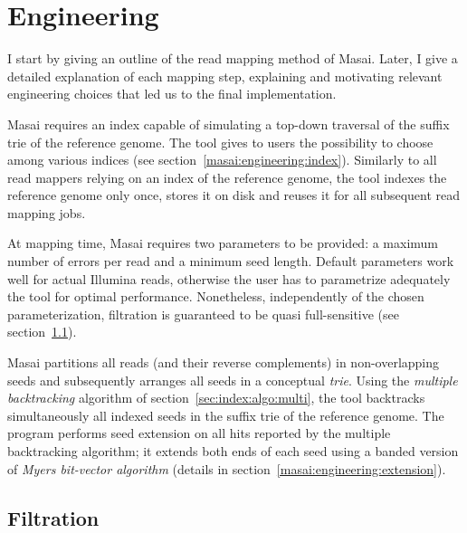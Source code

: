 
\section{Engineering}

I start by giving an outline of the read mapping method of Masai.
Later, I give a detailed explanation of each mapping step, explaining and motivating relevant engineering choices that led us to the final implementation.

Masai requires an index capable of simulating a top-down traversal of the suffix trie of the reference genome.
The tool gives to users the possibility to choose among various indices (see section~\ref{masai:engineering:index}).
Similarly to all read mappers relying on an index of the reference genome, the tool indexes the reference genome only once, stores it on disk and reuses it for all subsequent read mapping jobs.

At mapping time, Masai requires two parameters to be provided: a maximum number of errors per read and a minimum seed length.
Default parameters work well for actual Illumina reads, otherwise the user has to parametrize adequately the tool for optimal performance.
Nonetheless, independently of the chosen parameterization, filtration is guaranteed to be quasi full-sensitive (see section~\ref{masai:engineering:seeding}).

Masai partitions all reads (and their reverse complements) in non-overlapping seeds and subsequently arranges all seeds in a conceptual \emph{trie}.
Using the \emph{multiple backtracking} algorithm of section~\ref{sec:index:algo:multi}, the tool backtracks simultaneously all indexed seeds in the suffix trie of the reference genome.
The program performs seed extension on all hits reported by the multiple backtracking algorithm;
it extends both ends of each seed using a banded version of \emph{Myers bit-vector algorithm} \citep{Myers1999} (details in section~\ref{masai:engineering:extension}).

\subsection{Filtration}
\label{masai:engineering:seeding}


